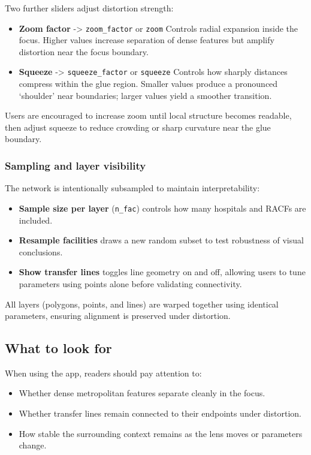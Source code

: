Two further sliders adjust distortion strength:

\begin{itemize}
\tightlist
\item
  \textbf{Zoom factor} -\textgreater{} \texttt{zoom\_factor} or \texttt{zoom} Controls radial expansion inside the focus. Higher values increase separation of dense features but amplify distortion near the focus boundary.
\item
  \textbf{Squeeze} -\textgreater{} \texttt{squeeze\_factor} or \texttt{squeeze} Controls how sharply distances compress within the glue region. Smaller values produce a pronounced `shoulder' near boundaries; larger values yield a smoother transition.
\end{itemize}

Users are encouraged to increase zoom until local structure becomes readable, then adjust squeeze to reduce crowding or sharp curvature near the glue boundary.

\subsubsection{Sampling and layer visibility}\label{sampling-and-layer-visibility}

The network is intentionally subsampled to maintain interpretability:

\begin{itemize}
\tightlist
\item
  \textbf{Sample size per layer} (\texttt{n\_fac}) controls how many hospitals and RACFs are included.
\item
  \textbf{Resample facilities} draws a new random subset to test robustness of visual conclusions.
\item
  \textbf{Show transfer lines} toggles line geometry on and off, allowing users to tune parameters using points alone before validating connectivity.
\end{itemize}

All layers (polygons, points, and lines) are warped together using identical parameters, ensuring alignment is preserved under distortion.

\subsection{What to look for}\label{what-to-look-for}

When using the app, readers should pay attention to:

\begin{itemize}
\tightlist
\item
  Whether dense metropolitan features separate cleanly in the focus.
\item
  Whether transfer lines remain connected to their endpoints under distortion.
\item
  How stable the surrounding context remains as the lens moves or parameters change.
\end{itemize}

